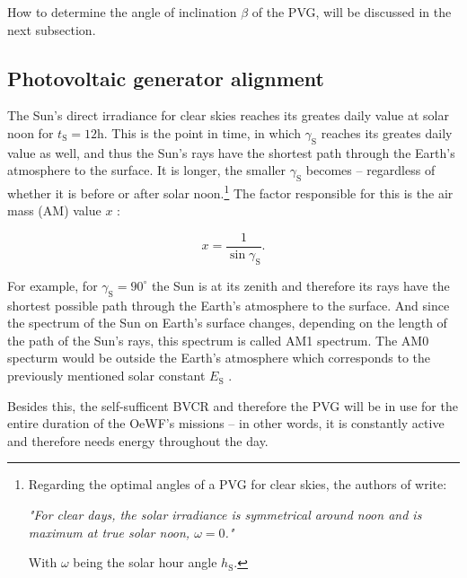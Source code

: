 How to determine the angle of inclination $\beta$ of the PVG, will be discussed in the next subsection.

%
%
%


\subsection{Photovoltaic generator alignment} \label{sec:photovoltaic_generator_alignment}
The Sun's direct irradiance for clear skies reaches its greates daily value at solar noon for $t_{\mathrm{S}} = 12\mathrm{h}$. This is the point in time, in which $\gamma_{\mathrm{S}}$ reaches its greates daily value as well, and thus the Sun's rays have the shortest path through the Earth's atmosphere to the surface. It is longer, the smaller $\gamma_{\mathrm{S}}$ becomes -- regardless of whether it is before or after solar noon.\footnote{Regarding the optimal angles of a PVG for clear skies, the authors of \cite{Appelbaum:1993} write: \begin{displayquote}\textit{"For clear days, the solar irradiance is symmetrical around noon and is maximum at true solar noon, $\omega = 0$."}\end{displayquote} With $\omega$ being the solar hour angle $h_{\mathrm{S}}$.} The factor responsible for this is the air mass (AM) value $x$ \cite{Appelbaum:1993, Bertol:2011, Mertens:2015, Wagner:2018}:

\begin{center}
	\begin{equation} \label{eq:air_mass}
		x = \frac{1}{\sin \gamma_{\mathrm{S}}} \text{.}
	\end{equation}
\end{center}

For example, for $\gamma_{\mathrm{S}} = 90^\circ$ the Sun is at its zenith and therefore its rays have the shortest possible path through the Earth's atmosphere to the surface. And since the spectrum of the Sun on Earth's surface changes, depending on the length of the path of the Sun's rays, this spectrum is called AM1 spectrum. The AM0 specturm would be outside the Earth's atmosphere which corresponds to the previously mentioned solar constant $E_{\mathrm{S}}$ \cite{Mertens:2015, Wagner:2018}. 

Besides this, the self-sufficent BVCR and therefore the PVG will be in use for the entire duration of the OeWF's missions -- in other words, it is constantly active and therefore needs energy throughout the day.

